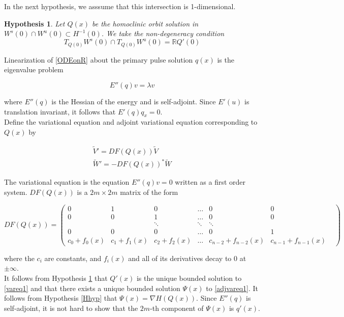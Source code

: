 \documentclass[12pt]{article}
\def\R{{\mathbb R}}
\newtheorem{hypothesis}{Hypothesis}
\begin{document}
In the next hypothesis, we asssume that this intersection is 1-dimensional. 

\begin{hypothesis}\label{nondegen1}
Let $Q(x)$ be the homoclinic orbit solution in $W^s(0) \cap W^u(0) \subset H^{-1}(0)$. We take the non-degeneracy condition
\begin{equation}
T_{Q(0)}W^s(0) \cap T_{Q(0)}W^u(0) = \R Q'(0)
\end{equation}
\end{hypothesis}

Linearization of \eqref{ODEonR} about the primary pulse solution $q(x)$ is the eigenvalue problem

\[
E''(q) v = \lambda v
\]

where $E''(q)$ is the Hessian of the energy and is self-adjoint. Since $E'(u)$ is translation invariant, it follows that $E'(q) q_x = 0$.\\

Define the variational equation and adjoint variational equation corresponding to $Q(x)$ by

\begin{align}
\tilde{V}' = DF(Q(x))\tilde{V} \label{vareq1} \\
\tilde{W}' = -DF(Q(x))^* \tilde{W} \label{adjvareq1}
\end{align}

The variational equation is the equation $E''(q) v = 0$ written as a first order system. $DF(Q(x))$ is a $2m \times 2m$ matrix of the form

\begin{equation}
DF(Q(x)) = \begin{pmatrix}
0 & 1 & 0 & \dots & 0 & 0 \\
0 & 0 & 1 & \dots & 0 & 0 \\
& & \ddots & \ddots & \ddots & & \\
0 & 0 & 0 & \dots & 0 & 1 \\
c_0 + f_0(x) & c_1 + f_1(x) & c_2 + f_2(x) &
 \dots & c_{n-2} + f_{n-2}(x) & c_{n-1} + f_{n-1}(x)
\end{pmatrix}
\end{equation}

where the $c_i$ are constants, and $f_i(x)$ and all of its derivatives decay to 0 at $\pm \infty$.\\

It follows from Hypothesis \ref{nondegen1} that $Q'(x)$ is the unique bounded solution to \eqref{vareq1} and that there exists a unique bounded solution $\Psi(x)$ to \eqref{adjvareq1}. It follows from Hypothesis \ref{Hhyp} that $\Psi(x) = \nabla H(Q(x))$. Since $E''(q)$ is self-adjoint, it is not hard to show that the $2m$-th component of $\Psi(x)$ is $q'(x)$.\\
\end{document}
